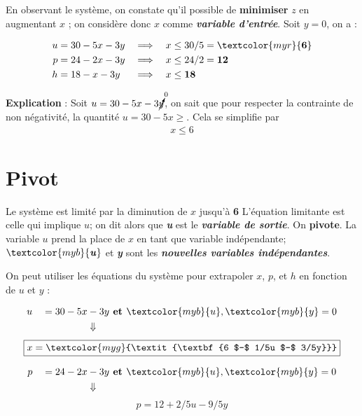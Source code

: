 \documentclass{report}
\begin{document}
\begin{multicols*}{3}
En observant le système, on constate qu'il possible de 
\textbf{minimiser} $z$ en augmentant $x$ ; on considère 
donc $x$ comme \textcolor{myb}{\textbf{\textit{variable d'entrée}}}. Soit 
$y = 0$, on a :

\begin{align*}
    u &= 30 - 5x -3y& 
    \implies \quad 
    & x \leq 30/5 = \textcolor{myr}{\textbf{6}}  
    \\
    p &= 24 -2x -3y 
    & \implies \quad  &  x \leq 24/2 = \textbf{12}  
    \\
    h &= 18 - x -3y&
    \implies \quad & x \leq \textbf{18}  
\end{align*}

\textbf{Explication} : Soit $u = 30 - 5x -3\cancelto{0}{y}$, on sait que pour respecter 
la contrainte de non négativité, la quantité $u = 30 -5x \geq$. Cela se simplifie par 
\begin{align*}
    x \leq 6
\end{align*}


\section{Pivot}

Le système est limité par la diminution de $x$ jusqu'à \textcolor{myr}{\textbf{6}} 
L'équation limitante est celle qui implique $u$; on dit alors que 
\textcolor{myr}{\textbf{\textit{u}}} est le 
\textcolor{myr}{\textbf{\textit{variable de sortie}}}. On 
\textbf{pivote}. La variable $u$ prend la place de $x$ en tant que
variable indépendante;
$\textcolor{myb}{\textbf{\textit{u}}}$ et  
\textcolor{myb}{\textbf{\textit{y}}} sont les 
\textcolor{myb}{\textbf{\textit{nouvelles variables indépendantes}}}.   

On peut utiliser les équations du système pour extrapoler 
$x$, $p$, et $h$ en fonction de $u$ et $y$ :


\begin{align*}
    u \quad = 30 - 5x &- 3y 
    \textbf{ et } \textcolor{myb}{u}, \textcolor{myb}{y} = 0 
    \\
                         &\Downarrow
\end{align*}
      \[%
          \boxed{x = \textcolor{myg}{\textit{\textbf{6 $-$ 1/5u $-$ 3/5y}}}}
      \]%


\begin{align*}
    p \quad = 24 - 2x &- 3y
    \textbf{ et } \textcolor{myb}{u}, \textcolor{myb}{y} = 0 
    \\
                 &\Downarrow
\end{align*}
      \[%
    \boxed{p = 12 +2/5u -9/5y}
      \]%


\end{multicols*}
\end{document}
